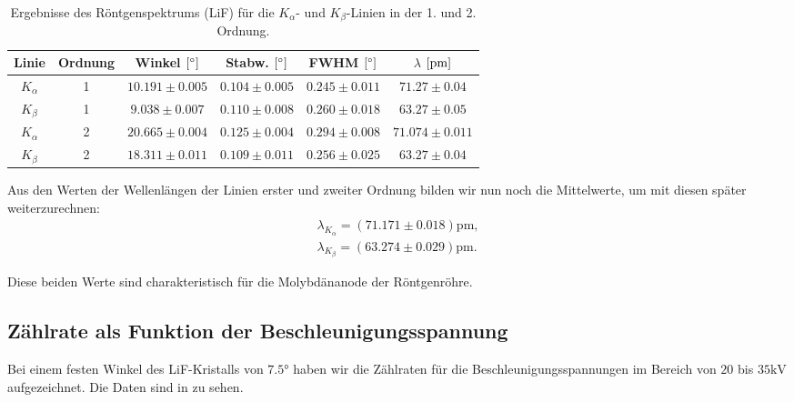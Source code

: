 \begin{table}[H]
  \centering
  \begin{tabular}{c|c|c|c|c|c}
    Linie & Ordnung & Winkel $\qty[\si{\degree}]$ & Stabw. $\qty[\si{\degree}]$ & FWHM $\qty[\si{\degree}]$ & $\lambda$ $\qty[\si{\pico\meter}]$\\\hline
    $K_{\alpha}$ & 1 & $10.191 \pm 0.005$ & $0.104 \pm 0.005$ & $0.245 \pm 0.011$ & $71.27 \pm 0.04$ \\
    $K_{\beta}$  & 1 & $9.038 \pm 0.007$  & $0.110 \pm 0.008$ & $0.260 \pm 0.018$ & $63.27 \pm 0.05$ \\\hline
    $K_{\alpha}$ & 2 & $20.665 \pm 0.004$ & $0.125 \pm 0.004$ & $0.294 \pm 0.008$ & $71.074 \pm 0.011$ \\
    $K_{\beta}$  & 2 & $18.311 \pm 0.011$ & $0.109 \pm 0.011$ & $0.256 \pm 0.025$ & $63.27 \pm 0.04$ \\\hline
  \end{tabular}
  \caption{Ergebnisse des Röntgenspektrums (LiF) für die $K_{\alpha}$- und $K_{\beta}$-Linien in der 1. und 2. Ordnung.}
  \label{tab:roentgenspektrum}
\end{table}

Aus den Werten der Wellenlängen der Linien erster und zweiter Ordnung bilden wir nun noch die Mittelwerte, um mit diesen später weiterzurechnen:
\begin{align}
  \lambda_{K_{\alpha}} = (71.171 \pm 0.018)\si{\pico\meter},\label{res:wl_kalp}\\[1em]
  \lambda_{K_{\beta}} = (63.274 \pm 0.029)\si{\pico\meter}.\label{res:wl_kbet}
\end{align}

Diese beiden Werte sind charakteristisch für die Molybdänanode der Röntgenröhre.

\subsection{Zählrate als Funktion der Beschleunigungsspannung}

Bei einem festen Winkel des LiF-Kristalls von $7.5\si{\degree}$ haben wir die Zählraten für die Beschleunigungsspannungen im Bereich von $20$ bis $35\si{\kilo\volt}$ aufgezeichnet. Die Daten sind in  zu sehen.

